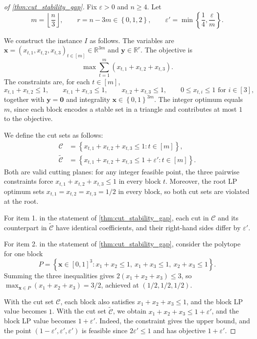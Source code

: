 \documentclass[smallextended,envcountsect]{svjour3} %
\newcommand{\set}[1]{\left\{#1\right\}}
\newcommand{\R}{\mathbb{R}}
\newcommand{\x}{\mathbf{x}}
\newcommand{\y}{\mathbf{y}}
\newcommand{\Ccal}{\mathcal{C}}
\newcommand{\0}{\mathbf{0}}
\newcommand{\1}{\mathbf{1}} %
\begin{document}
\begin{proof}[of \cref{thm:cut_stability_gap}]
	Fix $\varepsilon>0$ and $n\ge 4$.
	Let
	\[
		m=\left\lfloor\frac{n}{3}\right\rfloor,
		\qquad
		r=n-3m \in \set{0,1,2},
		\qquad
		\varepsilon'=\min\set{\frac{1}{4},\frac{\varepsilon}{m}}.
	\]

	We construct the instance $I$ as follows.
	The variables are $\x=(x_{t,1},x_{t,2},x_{t,3})_{t\in[m]}\in \R^{3m}$ and $\y\in \R^r$.
	The objective is
	\[
		\max \sum_{t=1}^m (x_{t,1}+x_{t,2}+x_{t,3}).
	\]
	The constraints are, for each $t \in [m]$,
	\[
		x_{t,1}+x_{t,2}\le 1,
		\qquad
			x_{t,1}+x_{t,3}\le 1,
			\qquad
			x_{t,2}+x_{t,3}\le 1,
			\qquad
			0\le x_{t,i}\le 1 \text{ for } i\in[3],
		\]
		together with $\y=\0$ and integrality $\x \in \set{0,1}^{3m}$.
		The integer optimum equals $m$, since each block encodes a stable set in a triangle and contributes at most $1$ to the objective.

			We define the cut sets as follows:
			\begin{align*}
				\Ccal
				 & = \set{x_{t,1}+x_{t,2}+x_{t,3}\le 1 : t\in[m]}, \\
				\widetilde{\Ccal}
				 & = \set{x_{t,1}+x_{t,2}+x_{t,3}\le 1+\varepsilon' : t\in[m]}.
			\end{align*}
		Both are valid cutting planes: for any integer feasible point, the three pairwise constraints force $x_{t,1}+x_{t,2}+x_{t,3}\le 1$ in every block $t$.
		Moreover, the root LP optimum sets $x_{t,1}=x_{t,2}=x_{t,3}=1/2$ in every block, so both cut sets are violated at the root.

		For item 1. in the statement of \cref{thm:cut_stability_gap}, each cut in $\Ccal$ and its counterpart in $\widetilde{\Ccal}$ have identical coefficients, and their right-hand sides differ by $\varepsilon'$.

	For item 2. in the statement of \cref{thm:cut_stability_gap}, consider the polytope for one block
	\[
		P=\set{\x\in [0,1]^3 : x_1+x_2\le 1,\ x_1+x_3\le 1,\ x_2+x_3\le 1}.
	\]
	Summing the three inequalities gives $2(x_1+x_2+x_3)\le 3$, so $\max_{\x\in P} (x_1+x_2+x_3)=3/2$, achieved at $(1/2,1/2,1/2)$.

	With the cut set $\Ccal$, each block also satisfies $x_1+x_2+x_3\le 1$, and the block LP value becomes $1$.
	With the cut set $\widetilde{\Ccal}$, we obtain $x_1+x_2+x_3\le 1+\varepsilon'$, and the block LP value becomes $1+\varepsilon'$.
	Indeed, the constraint gives the upper bound, and the point $(1-\varepsilon',\varepsilon',\varepsilon')$ is feasible since $2\varepsilon'\le 1$ and has objective $1+\varepsilon'$.


\end{proof}
\end{document}
